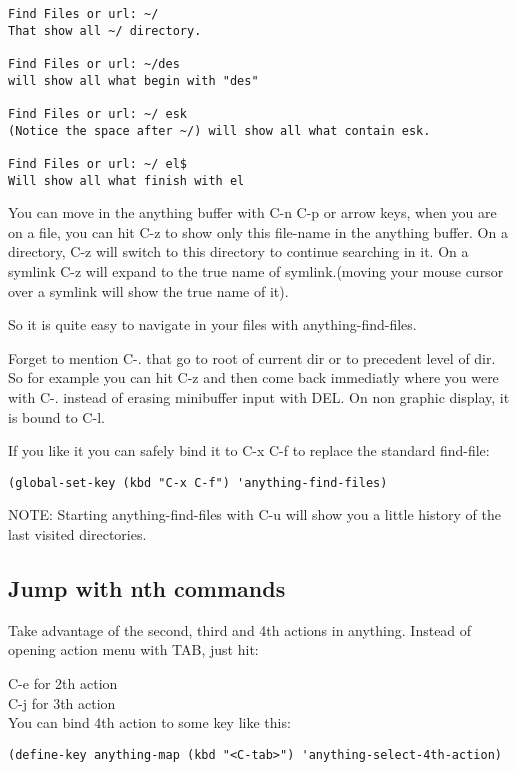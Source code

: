 \documentclass[a4paper,11pt]{article}
\begin{document}
\begin{verbatim}
Find Files or url: ~/
That show all ~/ directory.

Find Files or url: ~/des
will show all what begin with "des"

Find Files or url: ~/ esk
(Notice the space after ~/) will show all what contain esk.

Find Files or url: ~/ el$
Will show all what finish with el

\end{verbatim}
You can move in the anything buffer with C-n C-p or arrow keys, when you
are on a file, you can hit C-z to show only this file-name in the
anything buffer.
On a directory, C-z will switch to this directory to continue searching
in it.
On a symlink C-z will expand to the true name of symlink.(moving your
mouse cursor over a symlink will show the true name of it).

So it is quite easy to navigate in your files with anything-find-files.

Forget to mention C-. that go to root of current dir or to precedent
level of dir.
So for example you can hit C-z and then come back immediatly where you
were with C-. instead of erasing minibuffer input with DEL.
On non graphic display, it is bound to C-l.

If you like it you can safely bind it to C-x C-f to replace the standard
find-file:

\begin{verbatim}
(global-set-key (kbd "C-x C-f") 'anything-find-files)
\end{verbatim}

NOTE:
Starting anything-find-files with C-u will show you a little history of the last visited directories.


\subsection{Jump with nth commands}
\label{sec:jump-with-nth}
Take advantage of the second, third and 4th actions in anything.
Instead of opening action menu with TAB, just hit:

C-e for 2th action\\
C-j for 3th action\\

You can bind 4th action to some key like this:
\begin{verbatim}
(define-key anything-map (kbd "<C-tab>") 'anything-select-4th-action)
\end{verbatim}
 
\end{document}

